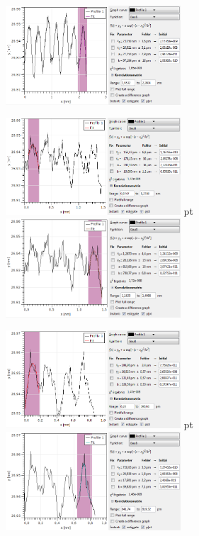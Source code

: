 \documentclass[12pt,listof=totoc]{scrartcl}
\begin{document}
\begin{minipage}[h!]{\textwidth}
	\includegraphics[width=0.49\textwidth]{figures/fitdata/Gaussfit-7-horizontal.png}
\end{minipage}
\begin{minipage}[h!]{\textwidth}
	\centering
	\includegraphics[width=0.49\textwidth]{figures/fitdata/Gaussfit-1-diagonalloru.png} pt
	\includegraphics[width=0.49\textwidth]{figures/fitdata/Gaussfit-letzter-diagonaloru.png}
\end{minipage}
\vskip 20pt
\begin{minipage}[h!]{\textwidth}
	\centering
	\includegraphics[width=0.49\textwidth]{figures/fitdata/Gaussfit-1-diagonalrolu.png} pt
	\includegraphics[width=0.49\textwidth]{figures/fitdata/Gaussfit-letzter-diagonalrolu.png}
\end{minipage}
\end{document}
